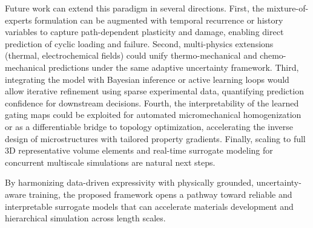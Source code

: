 \documentclass{article}
\begin{document}
\medskip

Future work can extend this paradigm in several directions. First, the mixture-of-experts formulation can be augmented with temporal recurrence or history variables to capture path-dependent plasticity and damage, enabling direct prediction of cyclic loading and failure. Second, multi-physics extensions (thermal, electrochemical fields) could unify thermo-mechanical and chemo-mechanical predictions under the same adaptive uncertainty framework. Third, integrating the model with Bayesian inference or active learning loops would allow iterative refinement using sparse experimental data, quantifying prediction confidence for downstream decisions. Fourth, the interpretability of the learned gating maps could be exploited for automated micromechanical homogenization or as a differentiable bridge to topology optimization, accelerating the inverse design of microstructures with tailored property gradients. Finally, scaling to full 3D representative volume elements and real-time surrogate modeling for concurrent multiscale simulations are natural next steps.

By harmonizing data-driven expressivity with physically grounded, uncertainty-aware training, the proposed framework opens a pathway toward reliable and interpretable surrogate models that can accelerate materials development and hierarchical simulation across length scales.



\end{document}

